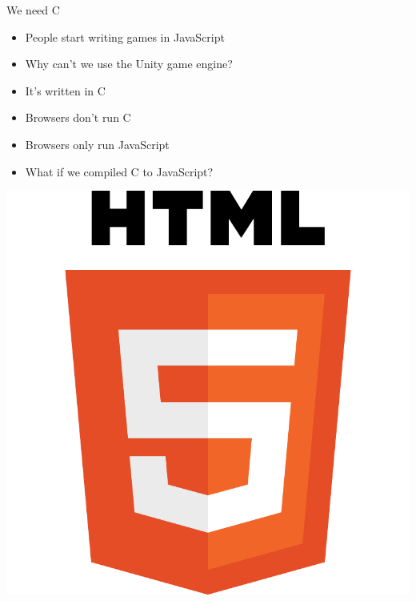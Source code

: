 \documentclass{lug}
\newcommand{\pmidg}[1]{\parbox{\widthof{#1}}{#1}}
\newcommand{\splitslide}[4]{%
    \noindent
    \begin{minipage}{#1 \textwidth - #2 }
        #3
    \end{minipage}%
    \hspace{ \dimexpr #2 * 2 \relax }%
    \begin{minipage}{\textwidth - #1 \textwidth - #2 }
        #4
    \end{minipage}
}
\begin{document}
\begin{frame}{We need C}
    \splitslide{0.75}{1em}{\begin{itemize}
        \item People start writing games in JavaScript
        \item Why can't we use the Unity game engine?
        \item It's written in C
        \item Browsers don't run C
        \item Browsers only run JavaScript
        \item What if we compiled C to JavaScript?
    \end{itemize}}{\pmidg{
        \includegraphics[width=\columnwidth]{graphics/html5_logo} \\
        \vspace{1cm} \\
}}
\end{frame}
\end{document}
